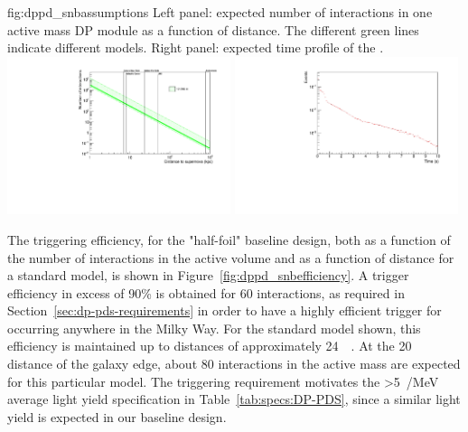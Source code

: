 \begin{dunefigure}{fig:dppd_snbassumptions}
     {Left panel: expected number of  \nue {} interactions in one \dpactivelarmass active mass DP module as a function of  distance. The different green lines indicate different  models. Right panel: expected time profile of the .}
    \includegraphics[width=0.49\textwidth]{graphics/dppd_events_vs_sndistance.pdf} \hfill
    \includegraphics[width=0.49\textwidth]{graphics/dppd_sntime_profile.pdf} 
    \end{dunefigure}

The  triggering efficiency, for the "half-foil" baseline  design, both as a function of the number of  interactions in the active volume and as a function of  distance for a standard  model, is shown in Figure~\ref{fig:dppd_snbefficiency}. A trigger efficiency in excess of \num{90}\% is obtained for \num{60}  interactions, as required in Section~\ref{sec:dp-pds-requirements} in order to have a highly efficient trigger for  occurring anywhere in the Milky Way. For the standard  model shown, this efficiency is maintained up to  distances of approximately \SI{24}{\kilo\parsec}. At the \SI{20}{\kilo\parsec} distance of the galaxy edge, about \num{80}  interactions in the \dpactivelarmass active mass are expected for this particular  model. The  triggering requirement motivates the \SI{>5}{/\MeV} average light yield specification in Table~\ref{tab:specs:DP-PDS}, since a similar light yield is expected in our baseline design.

